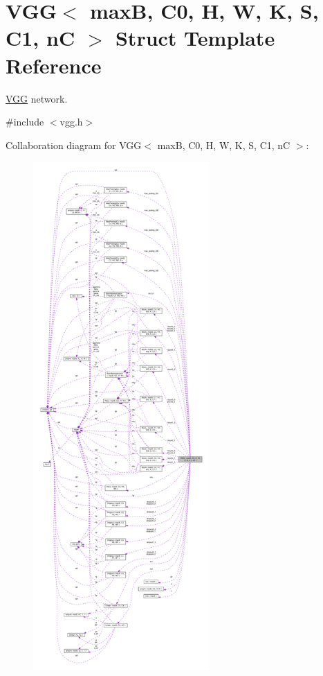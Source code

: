 \hypertarget{structVGG}{}\section{V\+GG$<$ maxB, C0, H, W, K, S, C1, nC $>$ Struct Template Reference}
\label{structVGG}


\hyperlink{structVGG}{V\+GG} network.  




{\ttfamily \#include $<$vgg.\+h$>$}



Collaboration diagram for V\+GG$<$ maxB, C0, H, W, K, S, C1, nC $>$\+:
\nopagebreak
\begin{figure}[H]
\begin{center}
\leavevmode
\includegraphics[height=550pt]{structVGG__coll__graph}
\end{center}
\end{figure}
